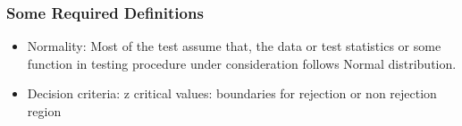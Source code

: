 \begin{frame}[fragile]\frametitle{Some Required Definitions}
\begin{itemize}
\item Normality: Most of the test assume that, the data or test statistics 
or some function in testing procedure under consideration follows 
Normal distribution. 
 
\item Decision  criteria: z critical values:  boundaries for rejection or non rejection region
\end{itemize}
\end{frame}
